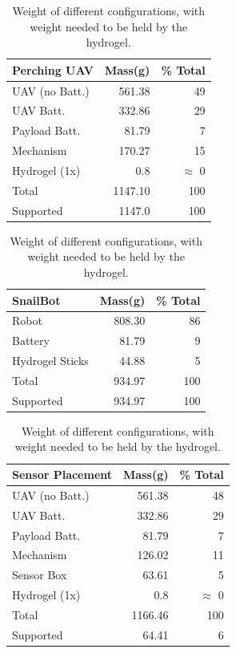 \begin{table}
    \centering
    \caption{Weight of different configurations, with weight needed to be held by the hydrogel.}
      \begin{tabular}[t]{lrr}
        Perching UAV  & Mass(g) & \% Total \\
        \hline
        UAV (no Batt.) & 561.38 & 49 \\ 
        UAV Batt. & 332.86 & 29 \\
        Payload Batt.  & 81.79 & 7\\
        Mechanism  & 170.27 & 15\\ 
        Hydrogel (1x)  & 0.8 & $\approx$ 0\\ 
        \hline
        Total & 1147.10 & 100\\
        Supported & 1147.0 & 100%
    \end{tabular}
    \hfill
    \begin{tabular}[t]{lrr}
        SnailBot  & Mass(g) & \% Total \\
        \hline
        Robot & 808.30 & 86\\
        Battery & 81.79 & 9\\
        Hydrogel Sticks  & 44.88 & 5\\ 
        \hline
        Total & 934.97 & 100   \\
        Supported & 934.97 & 100%
    \end{tabular}
    \hfill
    \begin{tabular}[t]{lrr}
        Sensor Placement  & Mass(g) & \% Total \\
        \hline
        UAV (no Batt.) & 561.38 & 48\\ 
        UAV Batt. & 332.86 & 29\\
        Payload Batt. & 81.79 & 7\\
        Mechanism  & 126.02 & 11\\ 
        Sensor Box  & 63.61 & 5\\
        Hydrogel (1x)  & 0.8 & $\approx$ 0\\ 
        \hline
        Total & 1166.46 & 100\\
        Supported & 64.41 & 6%
    \end{tabular}
    \label{tab:weight}
\end{table}

